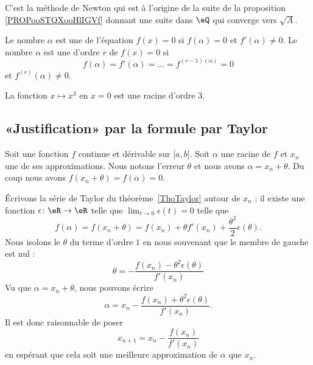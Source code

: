 C'est la méthode de Newton qui est à l'origine de la suite de la proposition \ref{PROPooSTQXooHlIGVf} donnant une suite dans \( \eQ\) qui converge vers \( \sqrt{ A} \).

\begin{definition}      \label{DEFooXSOQooAnWqKM}
	Le nombre \( \alpha\) est une  de l'équation \( f(x)=0\) si \( f(\alpha)=0\) et \( f'(\alpha)\neq 0\). Le nombre \( \alpha\) est une  d'ordre \( r\) de \( f(x)=0\) si
	\begin{equation}
		f(\alpha)=f'(\alpha)=\ldots=f^{(r-1)(\alpha)}=0
	\end{equation}
	et \( f^{(r)}(\alpha)\neq 0\).
\end{definition}

\begin{example}
	La fonction \( x\mapsto x^3\) en \( x=0\) est une racine d'ordre \( 3\).
\end{example}

\subsection{«Justification» par la formule par Taylor}

Soit une fonction \( f\) continue et dérivable sur \( \mathopen[ a , b \mathclose]\). Soit \( \alpha\) une racine de \( f\) et \( x_n\) une de ses approximations.  Nous notons l'erreur \( \theta\) et nous avons \( \alpha=x_n+\theta\). Du coup nous avons \( f(x_n+\theta)=f(\alpha)=0\).

Écrivons la série de Taylor du théorème~\ref{ThoTaylor} autour de \( x_n\) : il existe une fonction \( \epsilon\colon \eR\to \eR\) telle que \( \lim_{t\to 0} \epsilon(t)=0\) telle que
\begin{equation}        \label{EQooOPUBooYaznay}
	f(\alpha)=f(x_n+\theta)=f(x_n)+\theta f'(x_n)+\frac{ \theta^2 }{ 2 }\epsilon(\theta).
\end{equation}
Nous isolons le \( \theta\) du terme d'ordre \( 1\) en nous souvenant que le membre de gauche est nul :
\begin{equation}
	\theta=-\frac{ f(x_n)-\theta^2\epsilon(\theta) }{ f'(x_n) }
\end{equation}
Vu que \( \alpha=x_n+\theta\), nous pouvons écrire
\begin{equation}
	\alpha=x_n-\frac{ f(x_n)+\theta^2\epsilon(\theta) }{ f'(x_n) }.
\end{equation}
Il est donc raisonnable de poser
\begin{equation}
	x_{n+1}=x_n-\frac{ f(x_n) }{ f'(x_n) }
\end{equation}
en espérant que cela soit une meilleure approximation de \( \alpha\) que \( x_n\).

